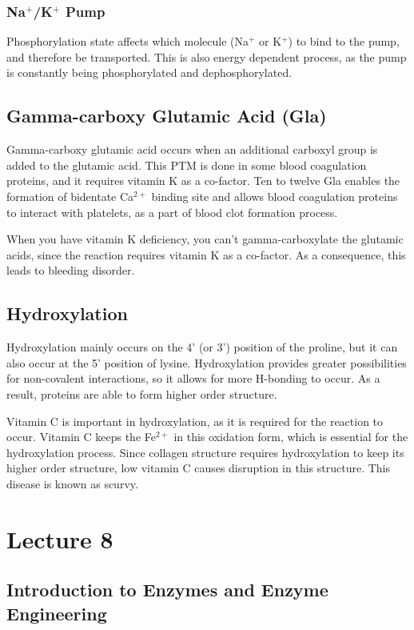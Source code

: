 \documentclass[a4paper, 12pt]{report}
\newcommand{\mychapter}[2]{
    \setcounter{chapter}{#1}
    \setcounter{section}{0}
    \chapter*{#2}
    \addcontentsline{toc}{chapter}{#2}
}
\begin{document}
\subsection{Na$^+$/K$^+$ Pump}

Phosphorylation state affects which molecule (Na$^+$ or K$^+$) to bind to the pump, and therefore be transported.
This is also energy dependent process, as the pump is constantly being phosphorylated and dephosphorylated.

\section{Gamma-carboxy Glutamic Acid (Gla)}

Gamma-carboxy glutamic acid occurs when an additional carboxyl group is added to the glutamic acid.
This PTM is done in some blood coagulation proteins, and it requires vitamin K as a co-factor.
Ten to twelve Gla enables the formation of bidentate Ca$^{2+}$ binding site and allows blood coagulation proteins to interact with platelets, as a part of blood clot formation process.

When you have vitamin K deficiency, you can't gamma-carboxylate the glutamic acids, since the reaction requires vitamin K as a co-factor.
As a consequence, this leads to bleeding disorder.

\section{Hydroxylation}

Hydroxylation mainly occurs on the 4' (or 3') position of the proline, but it can also occur at the 5' position of lysine.
Hydroxylation provides greater possibilities for non-covalent interactions, so it allows for more H-bonding to occur.
As a result, proteins are able to form higher order structure.

Vitamin C is important in hydroxylation, as it is required for the reaction to occur.
Vitamin C keeps the Fe$^{2+}$ in this oxidation form, which is essential for the hydroxylation process.
Since collagen structure requires hydroxylation to keep its higher order structure, low vitamin C causes disruption in this structure.
This disease is known as scurvy.

\mychapter{8}{Lecture 8}

\section{Introduction to Enzymes and Enzyme Engineering}
\end{document}

